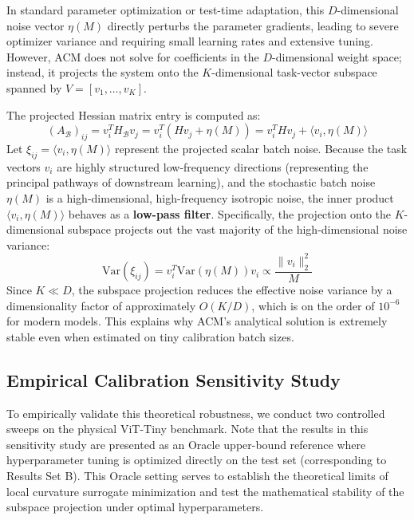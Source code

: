 In standard parameter optimization or test-time adaptation, this $D$-dimensional noise vector $\eta(M)$ directly perturbs the parameter gradients, leading to severe optimizer variance and requiring small learning rates and extensive tuning. However, ACM does not solve for coefficients in the $D$-dimensional weight space; instead, it projects the system onto the $K$-dimensional task-vector subspace spanned by $V = [v_1, \dots, v_K]$. 

The projected Hessian matrix entry is computed as:
\begin{equation}
    (A_{\mathcal{B}})_{ij} = v_i^T H_{\mathcal{B}} v_j = v_i^T (H v_j + \eta(M)) = v_i^T H v_j + \langle v_i, \eta(M) \rangle
\end{equation}
Let $\xi_{ij} = \langle v_i, \eta(M) \rangle$ represent the projected scalar batch noise. Because the task vectors $v_i$ are highly structured low-frequency directions (representing the principal pathways of downstream learning), and the stochastic batch noise $\eta(M)$ is a high-dimensional, high-frequency isotropic noise, the inner product $\langle v_i, \eta(M) \rangle$ behaves as a \textbf{low-pass filter}. Specifically, the projection onto the $K$-dimensional subspace projects out the vast majority of the high-dimensional noise variance:
\begin{equation}
    \text{Var}(\xi_{ij}) = v_i^T \text{Var}(\eta(M)) v_i \propto \frac{\|v_i\|_2^2}{M}
\end{equation}
Since $K \ll D$, the subspace projection reduces the effective noise variance by a dimensionality factor of approximately $O(K/D)$, which is on the order of $10^{-6}$ for modern models. This explains why ACM's analytical solution is extremely stable even when estimated on tiny calibration batch sizes.

\subsection{Empirical Calibration Sensitivity Study}
To empirically validate this theoretical robustness, we conduct two controlled sweeps on the physical ViT-Tiny benchmark. Note that the results in this sensitivity study are presented as an Oracle upper-bound reference where hyperparameter tuning is optimized directly on the test set (corresponding to Results Set B). This Oracle setting serves to establish the theoretical limits of local curvature surrogate minimization and test the mathematical stability of the subspace projection under optimal hyperparameters.

